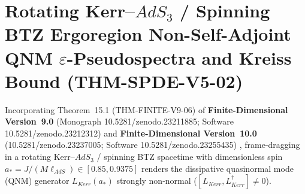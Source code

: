 \documentclass[11pt,a4paper,reqno]{article}
\def\texttt#1{#1}%
\def\mathrm#1{#1}%
\def\mathcal#1{#1}%
\def\zenodo#1{10.5281/zenodo.#1}%
\newcommand{\zenodo}[1]{\href{https://doi.org/10.5281/zenodo.#1}{\texttt{10.5281/\allowbreak zenodo.#1}}}
\theoremstyle{plain}
\theoremstyle{definition}
\theoremstyle{remark}
\numberwithin{equation}{section}
\begin{document}
\section{Rotating Kerr--\texorpdfstring{$\mathrm{AdS}_3$}{AdS3} / Spinning BTZ Ergoregion Non-Self-Adjoint QNM \texorpdfstring{$\varepsilon$}{Epsilon}-Pseudospectra and Kreiss Bound (\texttt{THM-SPDE-V5-02})}
\label{sec:spde_v5_kerr_ads3_pseudospectra}

Incorporating Theorem~15.1 (\texttt{THM-FINITE-V9-06}) of \textbf{Finite-Dimensional Version~9.0} (Monograph \zenodo{23211885}; Software \zenodo{23212312}) \cite{ananda2026finite_v90} and \textbf{Finite-Dimensional Version~10.0} (\zenodo{23237005}; Software \zenodo{23255435}) \cite{ananda2026finite_v100}, frame-dragging in a rotating Kerr--$\mathrm{AdS}_3$ / spinning BTZ spacetime with dimensionless spin $a_* = J/(M\ell_{\mathrm{AdS}}) \in [0.85, 0.9375]$ renders the dissipative quasinormal mode (QNM) generator $\mathcal{L}_{\mathrm{Kerr}}(a_*)$ strongly non-normal ($[\mathcal{L}_{\mathrm{Kerr}}, \mathcal{L}_{\mathrm{Kerr}}^\dagger] \neq 0$).
\end{document}
